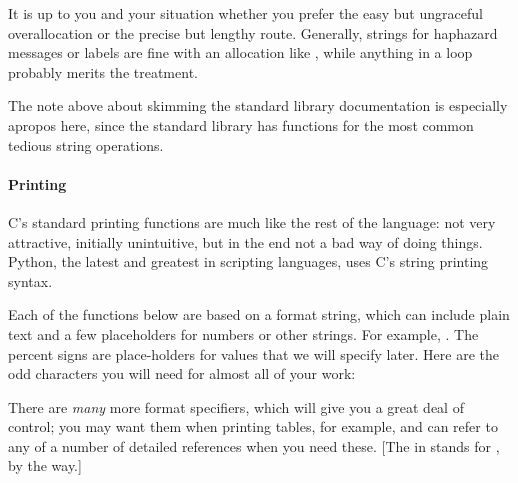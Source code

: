 \documentclass[12pt]{article}
\def\ind#1{\index{#1}#1}
\begin{document}
It is up to you and your situation whether you prefer the easy but
ungraceful overallocation or the precise but lengthy 
route. Generally, strings for haphazard messages or labels are fine with 
an allocation like , while anything in a
 loop probably merits the  treatment.

The note above about skimming the standard library documentation is especially apropos here, since the
standard library has functions for the most common tedious string operations.

\paragraph{Printing}
\label{printf}
C's standard printing functions are much like the rest of the language:
not very attractive, initially unintuitive, but in the end not a bad
way of doing things. \ind{Python}, the latest and greatest in scripting
languages, uses C's string printing syntax.

Each of the functions below are based on a format string, which
can include plain text and a few placeholders for numbers or
other strings. For example, . The percent signs are place-holders for values
that we will specify later. Here are the odd characters you will need
for almost all of your work:

\begin{center}
\end{center}

There are {\sl many} more format specifiers, which will give you a great deal of control; you may want
them when printing tables, for example, and can refer to any of a number of detailed references when you
need these. [The  in  stands for , by the way.]
\end{document}
